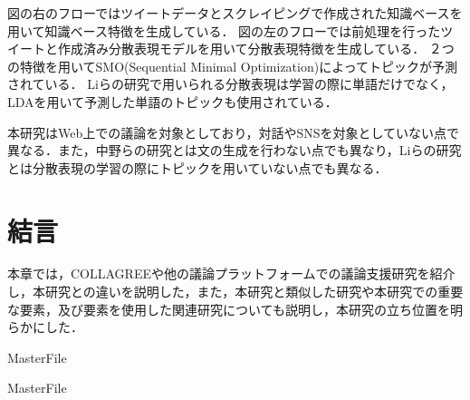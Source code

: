 図の右のフローではツイートデータとスクレイピングで作成された知識ベースを用いて知識ベース特徴を生成している．
図の左のフローでは前処理を行ったツイートと作成済み分散表現モデルを用いて分散表現特徴を生成している．
２つの特徴を用いてSMO(Sequential Minimal Optimization)によってトピックが予測されている．
Liらの研究で用いられる分散表現は学習の際に単語だけでなく，LDAを用いて予測した単語のトピックも使用されている．

本研究はWeb上での議論を対象としており，対話やSNSを対象としていない点で異なる．また，中野らの研究とは文の生成を行わない点でも異なり，Liらの研究とは分散表現の学習の際にトピックを用いていない点でも異なる．

\section{結言}
\label{rel:conclusion}
本章では，COLLAGREEや他の議論プラットフォームでの議論支援研究を紹介し，本研究との違いを説明した，また，本研究と類似した研究や本研究での重要な要素，及び要素を使用した関連研究についても説明し，本研究の立ち位置を明らかにした．

 \expandafter\ifx\csname MasterFile\endcsname\relax
	\def\BibFile{hoge}
	
  \fi
  \expandafter\ifx\csname MasterFile\endcsname\relax
  
  \fi
